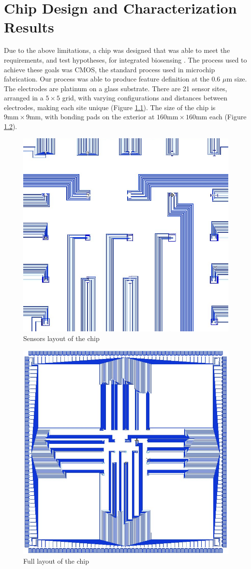 \chapter{Chip Design and Characterization Results}

Due to the above limitations, a chip was designed that was able to meet the requirements, and test hypotheses, for integrated biosensing \cite{karegar2007ema}. The process used to achieve these goals was CMOS, the standard process used in microchip fabrication. Our process was able to produce feature definition at the 0.6 $\mu \mathrm{m}$ size. The electrodes are platinum on a glass substrate. There are 21 sensor sites, arranged in a $5 \times 5$ grid, with varying configurations and distances between electrodes, making each site unique (Figure \ref{biosensorchip-sensors}). The size of the chip is $9 \mathrm{mm} \times 9 \mathrm{mm}$, with bonding pads on the exterior at $160 \mathrm{mm} \times 160 \mathrm{mm}$ each (Figure \ref{biosensorchip}).

\begin{figure}
	\centering
	\includegraphics[width=0.5\linewidth]{figures/biosensorchip-sensors.png}
	\caption{Sensors layout of the chip}
	\label{biosensorchip-sensors}
\end{figure}

\begin{figure}
	\centering
	\includegraphics[width=0.5\linewidth]{figures/biosensorchip.png}
	\caption{Full layout of the chip}
	\label{biosensorchip}
\end{figure}

